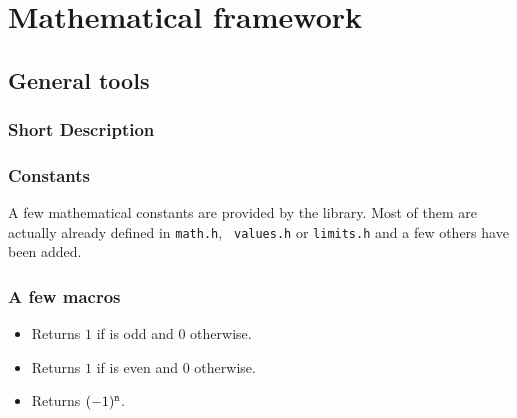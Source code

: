 \section{Mathematical framework}

\subsection{General tools}
\subsubsection{Short Description}

\subsubsection{Constants} A few mathematical constants are provided by the
library. Most of them are actually already defined in {\tt math.h}, {\tt
  values.h} or {\tt limits.h} and a few others have been added.
\begin{describeconst}
\end{describeconst}

\subsubsection{A few macros}
\begin{itemize}
\item {}
  \sshortdescribe Returns $1$ if  is odd and $0$ otherwise.
\item {}
  \sshortdescribe Returns $1$ if  is even and $0$ otherwise.
\item {}
  \sshortdescribe Returns $(-1)^{\tt n}$.
\end{itemize}

